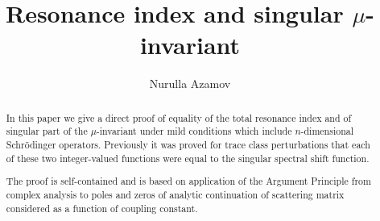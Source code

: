 \documentclass[11pt]{amsart}
\numberwithin{equation}{section}
\begin{document}
\title{Resonance index and singular $\mu$-invariant}
\author{Nurulla Azamov}
\address{School of Computer Science, Engineering and Mathematics
   \\ Flinders University
   \\ Bedford Park, 5042, SA Australia.}


\begin{abstract} In this paper we give a direct proof of equality of the total resonance index
and of singular part of the $\mu$-invariant under mild
conditions which include $n$-dimensional Schr\"odinger operators. Previously it was proved for trace class perturbations
that each of these two integer-valued functions were equal to the
singular spectral shift function.

The proof is self-contained and is based on application of the Argument Principle from complex analysis
to poles and zeros of analytic continuation of scattering matrix considered as a function of coupling constant.
\end{abstract}

\maketitle
\end{document}
